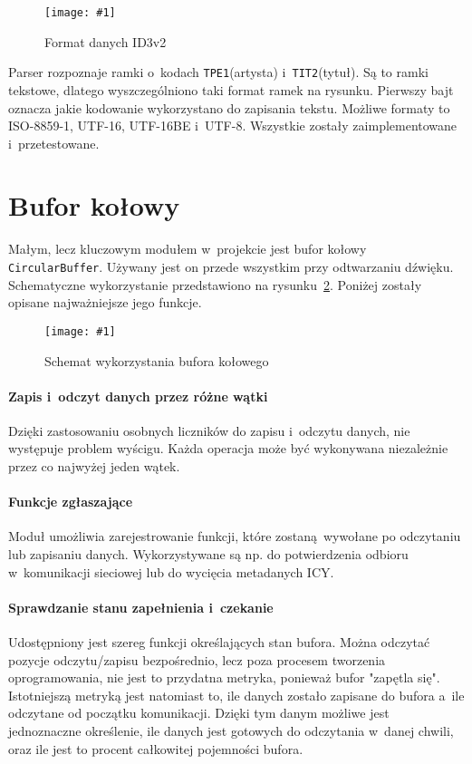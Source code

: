\documentclass[polish]{aghengthesis}
\newcommand{\imgint}[4]{
	\begin{figure}[{#4}]
		\centering
		\texttt{[image: \#1]}
		\caption{#2}
		\label{#1}
	\end{figure}
}
\newcommand{\imgh}[3]{\imgint{#1}{#2}{#3}{H}}
\begin{document}
			\imgh{3/PicoRadio-id3}{Format danych ID3v2}{0.8}
			
			Parser rozpoznaje ramki o~kodach \lstinline|TPE1|(artysta) i~\lstinline|TIT2|(tytuł). Są to ramki tekstowe, dlatego wyszczególniono taki format ramek na rysunku. Pierwszy bajt oznacza jakie kodowanie wykorzystano do zapisania tekstu. Możliwe formaty to ISO-8859-1, UTF-16, UTF-16BE i~UTF-8. Wszystkie zostały zaimplementowane i~przetestowane.
	
	\section{Bufor kołowy}
		\label{sec:circular_buffer}
		Małym, lecz kluczowym modułem w~projekcie jest bufor kołowy \lstinline|CircularBuffer|. Używany jest on przede wszystkim przy odtwarzaniu dźwięku. Schematyczne wykorzystanie przedstawiono na rysunku~\ref{3/PicoRadio-buffer}. Poniżej zostały opisane najważniejsze jego funkcje.
		
		\imgh{3/PicoRadio-buffer}{Schemat wykorzystania bufora kołowego}{0.8}
		
		\paragraph{Zapis i~odczyt danych przez różne wątki}
			Dzięki zastosowaniu osobnych liczników do zapisu i~odczytu danych, nie występuje problem wyścigu. Każda operacja może być wykonywana niezależnie przez co najwyżej jeden wątek.
			
		\paragraph{Funkcje zgłaszające}
			Moduł umożliwia zarejestrowanie funkcji, które zostaną wywołane po odczytaniu lub zapisaniu danych. Wykorzystywane są np. do potwierdzenia odbioru w~komunikacji sieciowej lub do wycięcia metadanych ICY.
		
		\paragraph{Sprawdzanie stanu zapełnienia i~czekanie}
			Udostępniony jest szereg funkcji określających stan bufora. Można odczytać pozycje odczytu/zapisu bezpośrednio, lecz poza procesem tworzenia oprogramowania, nie jest to przydatna metryka, ponieważ bufor "zapętla się". Istotniejszą metryką jest natomiast to, ile danych zostało zapisane do bufora a~ile odczytane od początku komunikacji. Dzięki tym danym możliwe jest jednoznaczne określenie, ile danych jest gotowych do odczytania w~danej chwili, oraz ile jest to procent całkowitej pojemności bufora.
		
\end{document}
